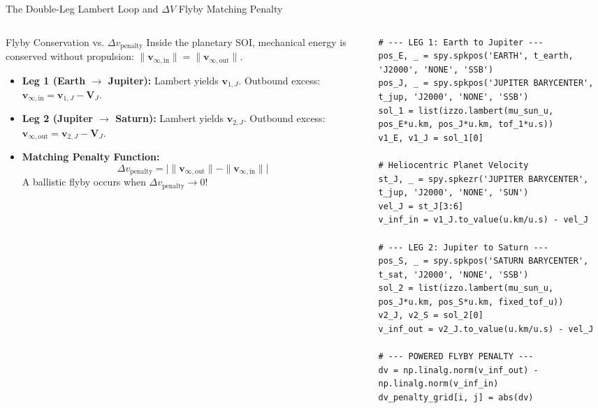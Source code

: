 \documentclass[aspectratio=169, 10pt]{beamer}
\begin{document}
\begin{frame}[fragile]{The Double-Leg Lambert Loop and \texorpdfstring{$\Delta V$}{Delta-V} Flyby Matching Penalty}
    \begin{columns}[t]
        \begin{column}{0.50\textwidth}
            \begin{block}{Flyby Conservation vs. $\Delta v_{\text{penalty}}$}
                \scriptsize
                Inside the planetary SOI, mechanical energy is conserved without propulsion: $\|\mathbf{v}_{\infty,\text{in}}\| = \|\mathbf{v}_{\infty,\text{out}}\|$.
                \begin{itemize}\setlength{\itemsep}{1pt}
                    \item \textbf{Leg 1 (Earth $\to$ Jupiter):} Lambert yields $\mathbf{v}_{1,J}$. Outbound excess: $\mathbf{v}_{\infty,\text{in}} = \mathbf{v}_{1,J} - \mathbf{V}_J$.
                    \item \textbf{Leg 2 (Jupiter $\to$ Saturn):} Lambert yields $\mathbf{v}_{2,J}$. Outbound excess: $\mathbf{v}_{\infty,\text{out}} = \mathbf{v}_{2,J} - \mathbf{V}_J$.
                    \item \textbf{Matching Penalty Function:}
                    \vspace{-0.05cm}
                    \begin{equation*}
                        \Delta v_{\text{penalty}} = \big| \|\mathbf{v}_{\infty,\text{out}}\| - \|\mathbf{v}_{\infty,\text{in}}\| \big|
                    \end{equation*}
                    \vspace{-0.15cm}
                    A ballistic flyby occurs when $\Delta v_{\text{penalty}} \to 0$!
                \end{itemize}
            \end{block}
        \end{column}

        \begin{column}{0.48\textwidth}
\begin{lstlisting}[style=pythoncode]
# --- LEG 1: Earth to Jupiter ---
pos_E, _ = spy.spkpos('EARTH', t_earth, 'J2000', 'NONE', 'SSB')
pos_J, _ = spy.spkpos('JUPITER BARYCENTER', t_jup, 'J2000', 'NONE', 'SSB')
sol_1 = list(izzo.lambert(mu_sun_u, pos_E*u.km, pos_J*u.km, tof_1*u.s))
v1_E, v1_J = sol_1[0]

# Heliocentric Planet Velocity
st_J, _ = spy.spkezr('JUPITER BARYCENTER', t_jup, 'J2000', 'NONE', 'SUN')
vel_J = st_J[3:6]
v_inf_in = v1_J.to_value(u.km/u.s) - vel_J

# --- LEG 2: Jupiter to Saturn ---
pos_S, _ = spy.spkpos('SATURN BARYCENTER', t_sat, 'J2000', 'NONE', 'SSB')
sol_2 = list(izzo.lambert(mu_sun_u, pos_J*u.km, pos_S*u.km, fixed_tof_u))
v2_J, v2_S = sol_2[0]
v_inf_out = v2_J.to_value(u.km/u.s) - vel_J

# --- POWERED FLYBY PENALTY ---
dv = np.linalg.norm(v_inf_out) - np.linalg.norm(v_inf_in)
dv_penalty_grid[i, j] = abs(dv)
\end{lstlisting}
        \end{column}
    \end{columns}
\end{frame}
\end{document}
